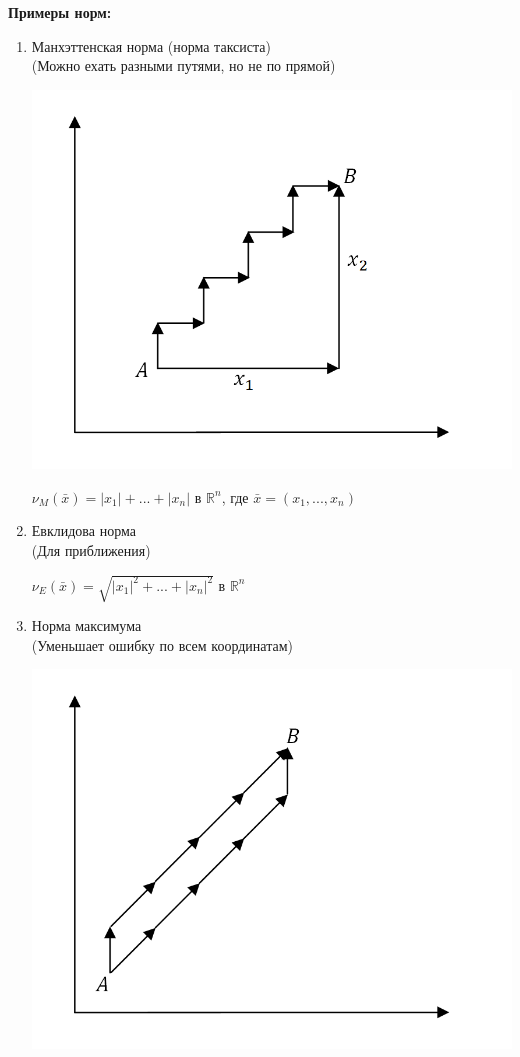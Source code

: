\documentclass[12pt]{article}
\theoremstyle{definition}
\numberwithin{equation}{section}
\begin{document}
	\textbf{Примеры норм:}\begin{enumerate}
		\item Манхэттенская норма (норма таксиста)\\
		(Можно ехать разными путями, но не по прямой)\begin{center}
			\includegraphics[scale=0.4]{l4_7.png}\end{center}
		\begin{center}$\nu_M(\bar x) = |x_1|+...+|x_n|$ в $\mathbb{R}^n$, где $\bar x = (x_1,..., x_n)$\end{center}
		\item Евклидова норма\\
		(Для приближения)
		\begin{center}
			$\nu_E(\bar x) = \sqrt{|x_1|^2+...+|x_n|^2}$ в $\mathbb{R}^n$\end{center}
		\item Норма максимума\\
		(Уменьшает ошибку по всем координатам)\begin{center}
			\includegraphics[scale=0.4]{l4_8.png}\end{center}

\end{enumerate}
\end{document}

